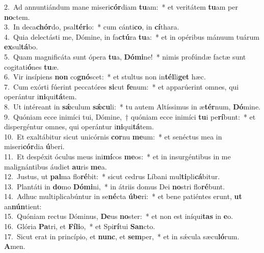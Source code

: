 {2.~}Ad annuntiándum mane miseri\textbf{cór}diam \textbf{tu}am:~* et veritátem \textbf{tu}am per \textbf{no}ctem.\\
{3.~}In deca\textbf{chór}do, psal\textbf{té}\textbf{ri}o:~* cum cánti\textbf{co}, in \textbf{cí}thara.\\
{4.~}Quia delectásti me, Dómine, in fa\textbf{ctú}ra \textbf{tu}a:~* et in opéribus mánuum tuárum \textbf{ex}sul\textbf{tá}bo.\\
{5.~}Quam magnificáta sunt ópera \textbf{tu}a, \textbf{Dó}\textbf{mi}ne!~* nimis profúndæ factæ sunt cogitati\textbf{ó}nes \textbf{tu}æ.\\
{6.~}Vir insípiens \textbf{non} co\textbf{gnó}scet:~* et stultus non in\textbf{tél}li\textbf{get} hæc.\\
{7.~}Cum exórti fúerint peccatóres \textbf{si}cut \textbf{fe}num:~* et apparúerint omnes, qui operántur i\textbf{ni}qui\textbf{tá}tem.\\
{8.~}Ut intéreant in \textbf{sǽ}culum \textbf{sǽ}\textbf{cu}li:~* tu autem Altíssimus in æ\textbf{tér}num, \textbf{Dó}mine.\\
{9.~}Quóniam ecce inimíci tui, Dómine,~† quóniam ecce inimíci \textbf{tu}i pe\textbf{rí}bunt:~* et dispergéntur omnes, qui operántur i\textbf{ni}qui\textbf{tá}tem.\\
{10.~}Et exaltábitur sicut unicórnis \textbf{cor}nu \textbf{me}um:~* et senéctus mea in miseri\textbf{cór}dia \textbf{ú}beri.\\
{11.~}Et despéxit óculus meus ini\textbf{mí}cos \textbf{me}os:~* et in insurgéntibus in me malignántibus áudiet \textbf{au}ris \textbf{me}a.\\
{12.~}Justus, ut \textbf{pal}ma flo\textbf{ré}bit:~* sicut cedrus Líbani mul\textbf{ti}pli\textbf{cá}bitur.\\
{13.~}Plantáti in \textbf{do}mo \textbf{Dó}\textbf{mi}ni,~* in átriis domus Dei \textbf{no}stri flo\textbf{ré}bunt.\\
{14.~}Adhuc multiplicabúntur in se\textbf{né}cta \textbf{ú}\textbf{be}ri:~* et bene patiéntes erunt, \textbf{ut} an\textbf{nún}tient:\\
{15.~}Quóniam rectus Dóminus, \textbf{De}us \textbf{no}ster:~* et non est iníqui\textbf{tas} in \textbf{e}o.\\
{16.~}Glória \textbf{Pa}tri, et \textbf{Fí}\textbf{li}o,~* et Spi\textbf{rí}tui \textbf{San}cto.\\
{17.~}Sicut erat in princípio, et \textbf{nunc}, et \textbf{sem}per,~* et in sǽcula sæcu\textbf{ló}rum. \textbf{A}men.\\
